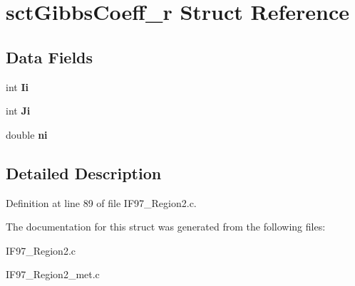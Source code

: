 \hypertarget{structsctGibbsCoeff__r}{\section{sct\-Gibbs\-Coeff\-\_\-r Struct Reference}
\label{structsctGibbsCoeff__r}
}
\subsection*{Data Fields}
\begin{DoxyCompactItemize}
\item 
\hypertarget{structsctGibbsCoeff__r_a6e0026e9f845ec5190db529fd89b463a}{int {\bfseries Ii}}\label{structsctGibbsCoeff__r_a6e0026e9f845ec5190db529fd89b463a}

\item 
\hypertarget{structsctGibbsCoeff__r_ab6e40923ebb0afb35f523e76768238e5}{int {\bfseries Ji}}\label{structsctGibbsCoeff__r_ab6e40923ebb0afb35f523e76768238e5}

\item 
\hypertarget{structsctGibbsCoeff__r_accc6766a0d8b53553672dc80fd0b87bc}{double {\bfseries ni}}\label{structsctGibbsCoeff__r_accc6766a0d8b53553672dc80fd0b87bc}

\end{DoxyCompactItemize}


\subsection{Detailed Description}


Definition at line 89 of file I\-F97\-\_\-\-Region2.\-c.



The documentation for this struct was generated from the following files\-:\begin{DoxyCompactItemize}
\item 
I\-F97\-\_\-\-Region2.\-c\item 
I\-F97\-\_\-\-Region2\-\_\-met.\-c\end{DoxyCompactItemize}
